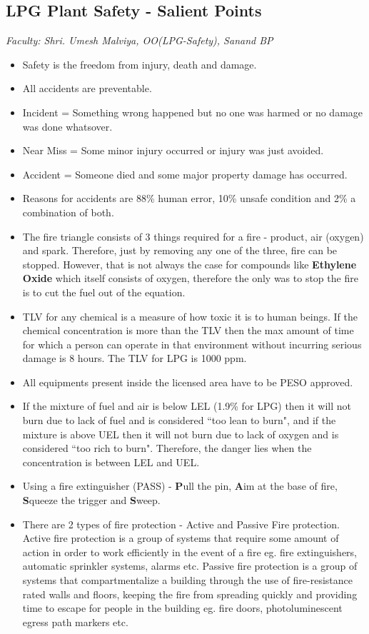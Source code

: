 \documentclass{report}
\begin{document}
	\subsection{LPG Plant Safety - Salient Points}
	\textit{Faculty: Shri. Umesh Malviya, OO(LPG-Safety), Sanand BP}\\
	\begin{itemize}
		\item Safety is the freedom from injury, death and damage.
		\item All accidents are preventable.
		\item Incident = Something wrong happened but no one was harmed or no damage was done whatsover.
		\item Near Miss = Some minor injury occurred or injury was just avoided.
		\item Accident = Someone died and some major property damage has occurred.
		\item Reasons for accidents are 88\% human error, 10\% unsafe condition and 2\% a combination of both.
		\item The fire triangle consists of 3 things required for a fire - product, air (oxygen) and spark. Therefore, just by removing any one of the three, fire can be stopped. However, that is not always the case for compounds like \textbf{Ethylene Oxide} which itself consists of oxygen, therefore the only was to stop the fire is to cut the fuel out of the equation.
		\item TLV for any chemical is a measure of how toxic it is to human beings. If the chemical concentration is more than the TLV then the max amount of time for which a person can operate in that environment without incurring serious damage is 8 hours. The TLV for LPG is 1000 ppm.
		\item All equipments present inside the licensed area have to be PESO approved.
		\item If the mixture of fuel and air is below LEL (1.9\% for LPG) then it will not burn due to lack of fuel and is considered ``too lean to burn", and if the mixture is above UEL then it will not burn due to lack of oxygen and is considered ``too rich to burn". Therefore, the danger lies when the concentration is between LEL and UEL.
		\item Using a fire extinguisher (PASS) - \textbf{P}ull the pin, \textbf{A}im at the base of fire, \textbf{S}queeze the trigger and \textbf{S}weep.
		\item There are 2 types of fire protection - Active and Passive Fire protection. Active fire protection is a group of systems that require some amount of action in order to work efficiently in the event of a fire eg. fire extinguishers, automatic sprinkler systems, alarms etc. Passive fire protection is a group of systems that compartmentalize a building through the use of fire-resistance rated walls and floors, keeping the fire from spreading quickly and providing time to escape for people in the building eg. fire doors,  photoluminescent egress path markers etc.

\end{itemize}
\end{document}
